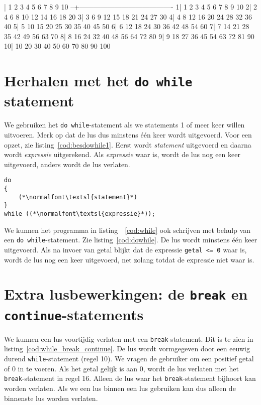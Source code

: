 \begin{dosbox}[title=Uitvoer van het programma in listing~\ref{cod:tables_with_for_loops}.,label=fig:tables_with_for_loops]
  |   1   2   3   4   5   6   7   8   9  10
--+----------------------------------------
 1|   1   2   3   4   5   6   7   8   9  10
 2|   2   4   6   8  10  12  14  16  18  20
 3|   3   6   9  12  15  18  21  24  27  30
 4|   4   8  12  16  20  24  28  32  36  40
 5|   5  10  15  20  25  30  35  40  45  50
 6|   6  12  18  24  30  36  42  48  54  60
 7|   7  14  21  28  35  42  49  56  63  70
 8|   8  16  24  32  40  48  56  64  72  80
 9|   9  18  27  36  45  54  63  72  81  90
10|  10  20  30  40  50  60  70  80  90 100
\end{dosbox}


\section{Herhalen met het \texttt{do while} statement}
We gebruiken het \texttt{do while}-statement als we statements 1 of meer keer willen uitvoeren. Merk op dat de lus dus minstens één keer wordt uitgevoerd. Voor een opzet, zie listing~\ref{cod:besdowhile1}. Eerst wordt \textsl{statement} uitgevoerd en daarna wordt \textsl{expressie} uitgerekend. Als \textsl{expressie} waar is, wordt de lus nog een keer uitgevoerd, anders wordt de lus verlaten.

\begin{lstlisting}[caption=Opzet \texttt{do while}-statement.,label=cod:besdowhile1]
do
{
    (*\normalfont\textsl{statement}*)
}
while ((*\normalfont\textsl{expressie}*));
\end{lstlisting}

We kunnen het programma in listing~~\ref{cod:while} ook schrijven met behulp van een \texttt{do while}-statement. Zie listing~\ref{cod:dowhile}. De lus wordt minstens één keer uitgevoerd. Als na invoer van getal blijkt dat de expressie \texttt{getal <= 0} waar is, wordt de lus nog een keer uitgevoerd, net zolang totdat de expressie niet waar is.
 


\section{Extra lusbewerkingen: de \texttt{break} en \texttt{continue}-statements}
\label{sec:extralusbewerkingen}
We kunnen een lus voortijdig verlaten met een \texttt{break}-statement. Dit is te zien in listing~\ref{cod:while_break_continue}. De lus wordt vormgegeven door een eeuwig durend \texttt{while}-statement (regel 10). We vragen de gebruiker om een positief getal of 0 in te voeren. Als het getal gelijk is aan 0, wordt de lus verlaten met het \texttt{break}-statement in regel 16. Alleen de lus waar het \texttt{break}-statement bijhoort kan worden verlaten. Als we een lus binnen een lus gebruiken kan dus alleen de binnenste lus worden verlaten.

